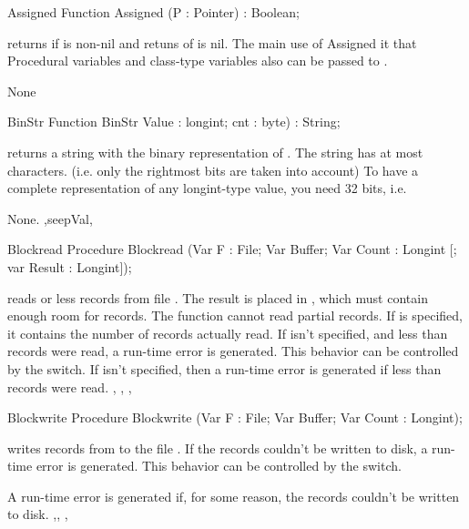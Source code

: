 \documentclass{report}
\begin{document}
\html{}
\begin{function}{Assigned}
\Declaration
Function Assigned (P : Pointer) : Boolean;

\Description
  returns  if  is non-nil
and retuns  of  is nil.
The main use of Assigned it that Procedural variables and
class-type variables also can be passed to .

\Errors
None
\SeeAlso

\end{function}
\begin{function}{BinStr}
\Declaration
Function BinStr Value : longint; cnt : byte) : String;

\Description
{} returns a string with the binary representation
of . The string has at most  characters.
(i.e. only the  rightmost bits are taken into account)
To have a complete representation of any longint-type value, you need 32
bits, i.e. 

\Errors
None.
\SeeAlso
{},seep{Val},
\end{function}
\html{}
\begin{procedure}{Blockread}
\Declaration
Procedure Blockread (Var F : File; Var Buffer; Var Count : Longint [; var
Result : Longint]);

\Description
{} reads  or less records from file . The
result is placed in , which must contain enough room for
 records. The function cannot read partial records.
If  is specified, it contains the number of records actually
read. If  isn't specified, and less than  records were
read, a run-time error is generated. This behavior can be controlled by the
 switch.
\Errors
If  isn't specified, then a run-time error is generated if less
than  records were read.
\SeeAlso
{}, , , 
\end{procedure}
\html{}
\begin{procedure}{Blockwrite}
\Declaration
Procedure Blockwrite (Var F : File; Var Buffer; Var Count : Longint);

\Description
{} writes  records from  to the file
 .
If the records couldn't be written to disk, a run-time error is generated.
This behavior can be controlled by the  switch.

\Errors
A run-time error is generated if, for some reason, the records couldn't be
written to disk.
\SeeAlso
{},, , 
\end{procedure}
\end{document}
